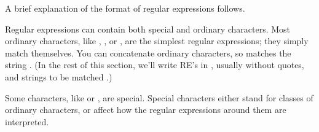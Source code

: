 A brief explanation of the format of regular expressions follows.  

Regular expressions can contain both special and ordinary characters.
Most ordinary characters, like , , or ,
are the simplest regular expressions; they simply match themselves.  
You can concatenate ordinary characters, so  matches the
string .  (In the rest of this section, we'll write RE's in
, usually without quotes, and strings to be
matched .)

Some characters, like \character{|} or \character{(}, are special.  Special
characters either stand for classes of ordinary characters, or affect
how the regular expressions around them are interpreted.


